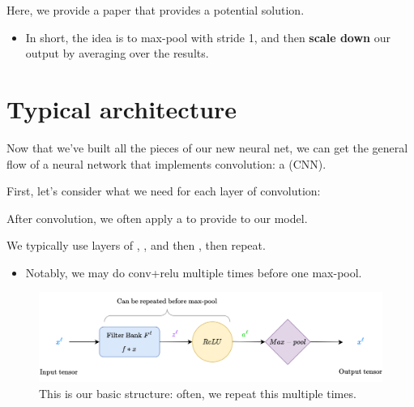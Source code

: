         Here, we provide a paper that provides a potential solution. 
        \begin{itemize}
            \item In short, the idea is to max-pool with stride 1, and then \textbf{scale down} our output by averaging over the results.
        \end{itemize}
            

\pagebreak

\section{Typical architecture}

    Now that we've built all the pieces of our new neural net, we can get the general flow of a neural network that implements convolution: a  (CNN).

    First, let's consider what we need for each layer of convolution:
        \\

    \begin{concept}
        After convolution, we often apply a  to provide  to our model.

        We typically use layers of , , and then , then repeat.

        \begin{itemize}
            \item Notably, we may do conv+relu multiple times before one max-pool.
        \end{itemize}
    \end{concept}
    
    \begin{figure}[H]
        \centering
        \includegraphics[width=.9\textwidth]{images/convolutional_neural_networks_images/cnn_layer.png}
        
        \caption*{This is our basic structure: often, we repeat this multiple times.}
    \end{figure}


